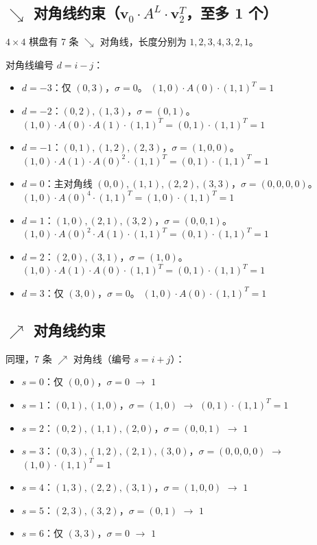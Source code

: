 \documentclass[12pt,a4paper]{article}
\newcommand{\bv}[1]{\boldsymbol{#1}}
\begin{document}
\subsection{$\searrow$ 对角线约束（$\bv{v}_0 \cdot A^L \cdot \bv{v}_2^T$，至多 1 个）}

$4\times 4$ 棋盘有 7 条 $\searrow$ 对角线，长度分别为 $1, 2, 3, 4, 3, 2, 1$。

\begin{exbox}
对角线编号 $d = i - j$：
\begin{itemize}[nosep]
  \item $d = -3$：仅 $(0,3)$，$\sigma=0$。$\;(1,0)\cdot A(0)\cdot(1,1)^T = 1$ \checkmark
  \item $d = -2$：$(0,2),(1,3)$，$\sigma=(0,1)$。$(1,0)\!\cdot\! A(0)\!\cdot\! A(1)\!\cdot\!(1,1)^T = (0,1)\!\cdot\!(1,1)^T=1$ \checkmark
  \item $d = -1$：$(0,1),(1,2),(2,3)$，$\sigma=(1,0,0)$。$(1,0)\!\cdot\! A(1)\!\cdot\! A(0)^2\!\cdot\!(1,1)^T = (0,1)\!\cdot\!(1,1)^T=1$ \checkmark
  \item $d = 0$：主对角线 $(0,0),(1,1),(2,2),(3,3)$，$\sigma=(0,0,0,0)$。$(1,0)\!\cdot\! A(0)^4\!\cdot\!(1,1)^T = (1,0)\!\cdot\!(1,1)^T=1$ \checkmark
  \item $d = 1$：$(1,0),(2,1),(3,2)$，$\sigma=(0,0,1)$。$(1,0)\!\cdot\! A(0)^2\!\cdot\! A(1)\!\cdot\!(1,1)^T = (0,1)\!\cdot\!(1,1)^T=1$ \checkmark
  \item $d = 2$：$(2,0),(3,1)$，$\sigma=(1,0)$。$(1,0)\!\cdot\! A(1)\!\cdot\! A(0)\!\cdot\!(1,1)^T = (0,1)\!\cdot\!(1,1)^T=1$ \checkmark
  \item $d = 3$：仅 $(3,0)$，$\sigma=0$。$\;(1,0)\cdot A(0)\cdot(1,1)^T = 1$ \checkmark
\end{itemize}
\end{exbox}

\subsection{$\nearrow$ 对角线约束}

同理，7 条 $\nearrow$ 对角线（编号 $s = i+j$）：

\begin{exbox}
\begin{itemize}[nosep]
  \item $s = 0$：仅 $(0,0)$，$\sigma=0$ $\to$ $1$ \checkmark
  \item $s = 1$：$(0,1),(1,0)$，$\sigma=(1,0)$ $\to$ $(0,1)\cdot(1,1)^T=1$ \checkmark
  \item $s = 2$：$(0,2),(1,1),(2,0)$，$\sigma=(0,0,1)$ $\to$ $1$ \checkmark
  \item $s = 3$：$(0,3),(1,2),(2,1),(3,0)$，$\sigma=(0,0,0,0)$ $\to$ $(1,0)\cdot(1,1)^T=1$ \checkmark
  \item $s = 4$：$(1,3),(2,2),(3,1)$，$\sigma=(1,0,0)$ $\to$ $1$ \checkmark
  \item $s = 5$：$(2,3),(3,2)$，$\sigma=(0,1)$ $\to$ $1$ \checkmark
  \item $s = 6$：仅 $(3,3)$，$\sigma=0$ $\to$ $1$ \checkmark
\end{itemize}
\end{exbox}
\end{document}
